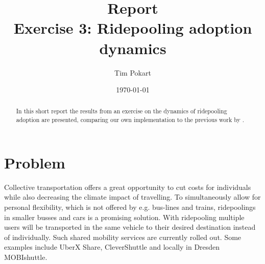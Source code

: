 \documentclass[aps,pra,showpacs,preprintnumbers,amsmath,amssymb,nofootinbib]{revtex4-2}
\begin{document}
    \title{Report\\{Exercise 3: Ridepooling adoption dynamics}}
    \author{Tim Pokart}
    \date{\today}
    
    \begin{abstract}
        In this short report the results from an exercise on the dynamics of ridepooling adoption are presented, comparing our own implementation to the previous work by \citeauthor{Wolf_2022} \cite{Wolf_2022}.
    \end{abstract}
        
    \maketitle

    \tableofcontents

    \section{Problem}

    Collective transportation offers a great opportunity to cut costs for individuals while also decreasing the climate impact of travelling. 
    To simultaneously allow for personal flexibility, which is not offered by e.g. bus-lines and trains, ridepoolings in smaller busses and cars is a promising solution.
    With ridepooling multiple users will be transported in the same vehicle to their desired destination instead of individually.
    Such shared mobility services are currently rolled out. 
    Some examples include UberX Share\cite{uberx_share}, CleverShuttle\cite{clevershuttle} and locally in Dresden MOBIshuttle\cite{dvb_mobishuttle}.
\end{document}
